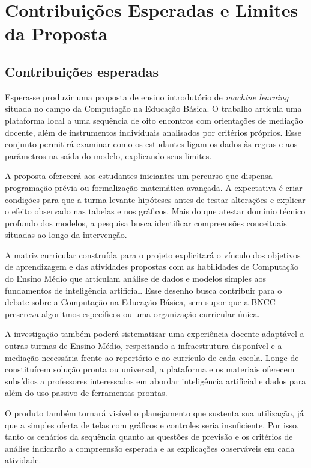 \chapter{Contribuições Esperadas e Limites da Proposta}

\section{Contribuições esperadas}

Espera-se produzir uma proposta de ensino introdutório de \textit{machine learning} situada no campo da Computação na Educação Básica. O trabalho articula uma plataforma local a uma sequência de oito encontros com orientações de mediação docente, além de instrumentos individuais analisados por critérios próprios. Esse conjunto permitirá examinar como os estudantes ligam os dados às regras e aos parâmetros na saída do modelo, explicando seus limites.

A proposta oferecerá aos estudantes iniciantes um percurso que dispensa programação prévia ou formalização matemática avançada. A expectativa é criar condições para que a turma levante hipóteses antes de testar alterações e explicar o efeito observado nas tabelas e nos gráficos. Mais do que atestar domínio técnico profundo dos modelos, a pesquisa busca identificar compreensões conceituais situadas ao longo da intervenção.

A matriz curricular construída para o projeto explicitará o vínculo dos objetivos de aprendizagem e das atividades propostas com as habilidades de Computação do Ensino Médio que articulam análise de dados e modelos simples aos fundamentos de inteligência artificial. Esse desenho busca contribuir para o debate sobre a Computação na Educação Básica, sem supor que a BNCC prescreva algoritmos específicos ou uma organização curricular única.

A investigação também poderá sistematizar uma experiência docente adaptável a outras turmas de Ensino Médio, respeitando a infraestrutura disponível e a mediação necessária frente ao repertório e ao currículo de cada escola. Longe de constituírem solução pronta ou universal, a plataforma e os materiais oferecem subsídios a professores interessados em abordar inteligência artificial e dados para além do uso passivo de ferramentas prontas.

O produto também tornará visível o planejamento que sustenta sua utilização, já que a simples oferta de telas com gráficos e controles seria insuficiente. Por isso, tanto os cenários da sequência quanto as questões de previsão e os critérios de análise indicarão a compreensão esperada e as explicações observáveis em cada atividade.

